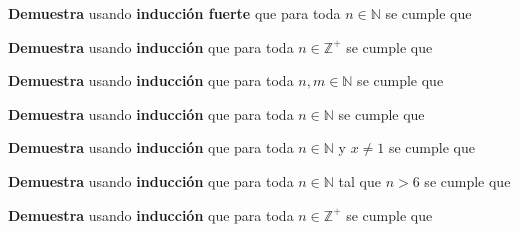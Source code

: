 \documentclass[oneside]{style}
\begin{document}
\begin{questions}[label=\protect\circled{\bfseries\arabic*}]
{        \textbf{Demuestra} usando \textbf{inducción fuerte} que para toda 
        $n \in \mathbb{N}$ se cumple que 
        \begin{center}
        \end{center} 
    }

    \newpage
    \question
    {
        \textbf{Demuestra} usando \textbf{inducción} que para toda 
        $n \in \mathbb{Z}^+$ se cumple que
        \begin{center}
        \end{center}
    }

    \question
    {
        \textbf{Demuestra} usando \textbf{inducción} que para toda 
        $n,m \in \mathbb{N}$ se cumple que
        \begin{center}
        \end{center}
    }

    \question
    {
        \textbf{Demuestra} usando \textbf{inducción} que para toda 
        $n \in \mathbb{N}$ se cumple que
        \begin{center}
        \end{center}
    }

    \question
    {
        \textbf{Demuestra} usando \textbf{inducción} que para toda 
        $n \in \mathbb{N}$ y $x \neq 1$ se cumple que
        \begin{center}
        \end{center}
    }

    \question
    {
        \textbf{Demuestra} usando \textbf{inducción} que para toda 
        $n \in \mathbb{N}$ tal que $n > 6$ se cumple que 
        \begin{center}
        \end{center}
    }

    \question
    {
        \textbf{Demuestra} usando \textbf{inducción} que para toda 
        $n \in \mathbb{Z}^+$ se cumple que
        \begin{center}
        \end{center}
    }


\end{questions}
\end{document}
